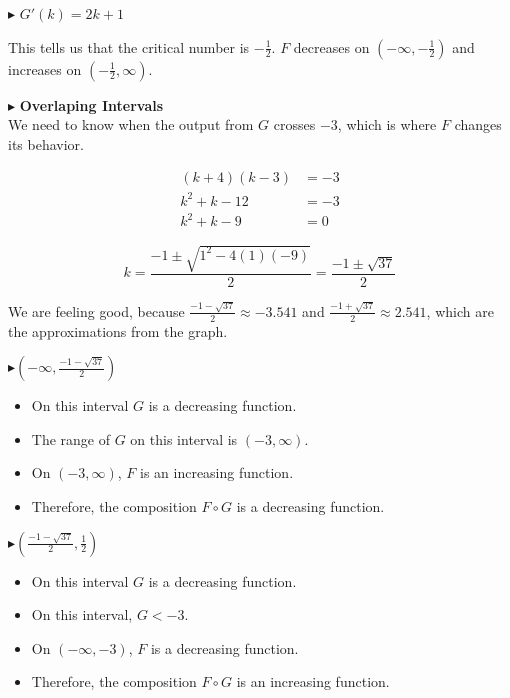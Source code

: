 \documentclass{ximera}
\begin{document}
\begin{example}
$\blacktriangleright$  $G'(k) = 2k + 1$

This tells us that the critical number is $-\frac{1}{2}$.  $F$ decreases on $(-\infty, -\frac{1}{2})$ and increases on $(-\frac{1}{2}, \infty)$.







\textbf{\textcolor{red!90!darkgray}{$\blacktriangleright$}} \textbf{\textcolor{purple!85!blue}{Overlaping Intervals}}  \\



We need to know when the output from $G$ crosses $-3$, which is where $F$ changes its behavior.





\begin{align*}
(k+4)(k-3) & = -3 \\
 k^2 + k - 12           & = -3  \\
 k^2 + k - 9         & = 0
\end{align*}


\[
k = \frac{-1 \pm \sqrt{1^2 - 4 (1) (-9)}}{2} = \frac{-1 \pm \sqrt{37}}{2} 
\]


We are feeling good, because $\frac{-1 - \sqrt{37}}{2} \approx -3.541$ and $\frac{-1 + \sqrt{37}}{2} \approx 2.541$, which are the approximations from the graph.






\textbf{\textcolor{blue!55!black}{$\blacktriangleright (-\infty, \frac{-1 - \sqrt{37}}{2})$}}


\begin{itemize}
\item On this interval $G$ is a decreasing function.
\item The range of $G$ on this interval is $(-3, \infty)$.
\item On $(-3, \infty)$, $F$ is an increasing function.
\item Therefore, the composition $F \circ G$ is a decreasing function.
\end{itemize}









\textbf{\textcolor{blue!55!black}{$\blacktriangleright (\frac{-1 - \sqrt{37}}{2}, \frac{1}{2})$}}


\begin{itemize}
\item On this interval $G$ is a decreasing function.
\item On this interval, $G < -3$.
\item On $(-\infty, -3)$, $F$ is a decreasing function.
\item Therefore, the composition $F \circ G$ is an increasing function.
\end{itemize}









\end{example}
\end{document}

